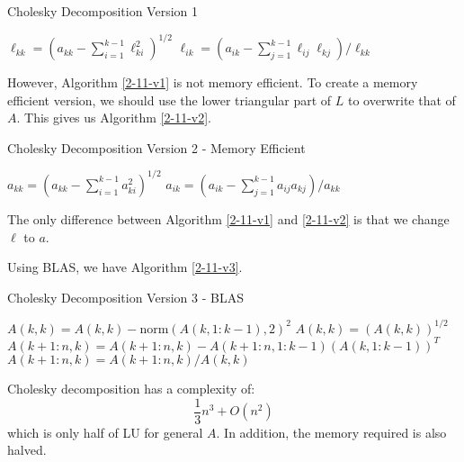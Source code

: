 \documentclass[../main/main.tex]{subfiles}
\begin{document}
        	\begin{algorithm}[h!]
	\caption{Cholesky Decomposition Version 1}
    \label{2-11-v1}
	\begin{algorithmic}[1]
      \State $\ell_{k k} = (a_{k k}- \sum_{i=1}^{k-1} \ell_{k i}^2)^{1 / 2}$
      \State $\ell_{ik} = (a_{ik}- \sum_{j=1}^{k-1} \ell_{ij}\ell_{kj}) / \ell_{k k}$
      \EndFor
      \EndFor
	\end{algorithmic}
	\end{algorithm}
    However, Algorithm \ref{2-11-v1} is not memory efficient. To create a memory efficient version, we should use the lower triangular part of $L$ to overwrite that of $A$. This gives us Algorithm \ref{2-11-v2}.
        	\begin{algorithm}[h!]
	\caption{Cholesky Decomposition Version 2 - Memory Efficient}
    \label{2-11-v2}
	\begin{algorithmic}[1]
      \State $a_{k k} = (a_{k k}- \sum_{i=1}^{k-1} a_{k i}^2)^{1 / 2}$
      \State $a_{ik} = (a_{ik}- \sum_{j=1}^{k-1}a_{ij}a_{kj}) / a_{k k}$
      \EndFor
      \EndFor
	\end{algorithmic}
	\end{algorithm}
    \begin{remark}
The only difference between Algorithm \ref{2-11-v1} and \ref{2-11-v2} is that we change $\ell$ to $a$.
    \end{remark}
    Using BLAS, we have Algorithm \ref{2-11-v3}.
        	\begin{algorithm}[h!]
	\caption{Cholesky Decomposition Version 3 - BLAS}
    \label{2-11-v3}
	\begin{algorithmic}[1]
      \State $A(k,k) = A(k,k)- \text{norm}(A(k,1:k-1),2)^2$
      \State $A(k,k) = (A(k,k))^{1 / 2}$
      \State $A(k+1:n,k) = A(k+1:n,k)-A(k+1:n,1:k-1)(A(k,1:k-1))^{T}$
      \State $A(k+1:n,k) = A(k+1:n,k) / A(k,k)$
      \EndFor
	\end{algorithmic}
	\end{algorithm}
    \begin{theorem}
      Cholesky decomposition has a complexity of: \[
        \frac{1}{3}n^{3}+O(n^2)
      \] which is only half of LU for general $A$. In addition, the memory required is also halved.
    \end{theorem}
\end{document}
